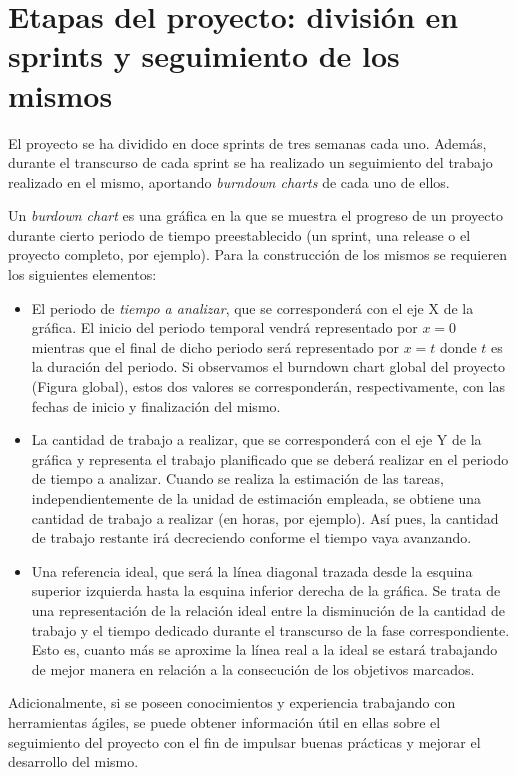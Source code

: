 \chapter{Etapas del proyecto: división en sprints y seguimiento de los mismos}\label{chapter:sprints}

El proyecto se ha dividido en doce sprints de tres semanas cada uno. Además, durante el transcurso de cada sprint se ha realizado un seguimiento del trabajo realizado en el mismo, aportando \emph{burndown charts} de cada uno de ellos.

Un \emph{burdown chart} es una gráfica en la que se muestra el progreso de un proyecto durante cierto periodo de tiempo preestablecido (un sprint, una release o el proyecto completo, por ejemplo). Para la construcción de los mismos se requieren los siguientes elementos:
\begin{itemize}
\item El periodo de \emph{tiempo a analizar}, que se corresponderá con el eje X de la gráfica. El inicio del periodo temporal vendrá representado por $x = 0$ mientras que el final de dicho periodo será representado por $x = t$ donde $t$ es la duración del periodo. Si observamos el burndown chart global del proyecto (Figura global), estos dos valores se corresponderán, respectivamente, con las fechas de inicio y finalización del mismo.
\item La cantidad de trabajo a realizar, que se corresponderá con el eje Y de la gráfica y representa el trabajo planificado que se deberá realizar en el periodo de tiempo a analizar. Cuando se realiza la estimación de las tareas, independientemente de la unidad de estimación empleada, se obtiene una cantidad de trabajo a realizar (en horas, por ejemplo). Así pues, la cantidad de trabajo restante irá decreciendo conforme el tiempo vaya avanzando.
\item Una referencia ideal, que será la línea diagonal trazada desde la esquina superior izquierda hasta la esquina inferior derecha de la gráfica. Se trata de una representación de la relación ideal entre la disminución de la cantidad de trabajo y el tiempo dedicado durante el transcurso de la fase correspondiente. Esto es, cuanto más se aproxime la línea real a la ideal se estará trabajando de mejor manera en relación a la consecución de los objetivos marcados.
\end{itemize}

Adicionalmente, si se poseen conocimientos y experiencia trabajando con herramientas ágiles, se puede obtener información útil en ellas sobre el seguimiento del proyecto con el fin de impulsar buenas prácticas y mejorar el desarrollo del mismo.

